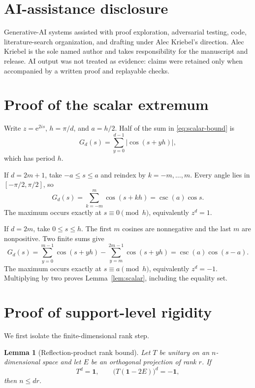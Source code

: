 \documentclass[11pt]{article}
\newtheorem{lemma}[theorem]{Lemma}
\theoremstyle{definition}
\theoremstyle{remark}
\newcommand{\Id}{\mathbf 1}
\newcommand{\e}{\mathrm e}
\newcommand{\absop}[1]{\lvert #1\rvert}
\begin{document}
\section*{AI-assistance disclosure}

Generative-AI systems assisted with proof exploration, adversarial testing,
code, literature-search organization, and drafting under Alec Kriebel's
direction.  Alec Kriebel is the sole named author and takes responsibility
for the manuscript and release.  AI output was not treated as evidence:
claims were retained only when accompanied by a written proof and replayable
checks.

\appendix

\section{Proof of the scalar extremum}
\label{app:scalar}

Write \(z=\e^{2is}\), \(h=\pi/d\), and \(a=h/2\).  Half of the sum in
\eqref{eq:scalar-bound} is
\[
 G_d(s)=\sum_{y=0}^{d-1}\absop{\cos(s+yh)},
\]
which has period \(h\).

If \(d=2m+1\), take \(-a\leq s\leq a\) and reindex by
\(k=-m,\ldots,m\).  Every angle lies in \([-\pi/2,\pi/2]\), so
\[
 G_d(s)=\sum_{k=-m}^m\cos(s+kh)=\csc(a)\cos s.
\]
The maximum occurs exactly at \(s\equiv0\pmod h\), equivalently \(z^d=1\).

If \(d=2m\), take \(0\leq s\leq h\).  The first \(m\) cosines are
nonnegative and the last \(m\) are nonpositive.  Two finite sums give
\[
 G_d(s)=\sum_{y=0}^{m-1}\cos(s+yh)
 -\sum_{y=m}^{2m-1}\cos(s+yh)
 =\csc(a)\cos(s-a).
\]
The maximum occurs exactly at \(s\equiv a\pmod h\), equivalently \(z^d=-1\).
Multiplying by two proves Lemma~\ref{lem:scalar}, including the equality set.

\section{Proof of support-level rigidity}
\label{app:rigidity-proof}

We first isolate the finite-dimensional rank step.

\begin{lemma}[Reflection-product rank bound]
\label{lem:reflection-rank}
Let \(T\) be unitary on an \(n\)-dimensional space and let \(E\) be an
orthogonal projection of rank \(r\).  If
\[
 T^d=\Id,
 \qquad \bigl(T(\Id-2E)\bigr)^d=-\Id,
\]
then \(n\leq dr\).
\end{lemma}
\end{document}
